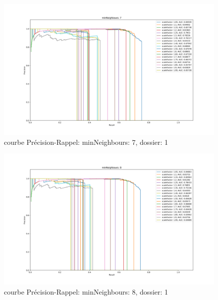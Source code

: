 \documentclass[a4paper,11pt]{article}
\begin{document}
	\begin{figure}[H]
	    \begin{center}
		\includegraphics[scale = 0.4]{images/courbes/folder_01_minN_7.png}
		\caption{courbe Précision-Rappel: minNeighbours: 7, dossier: 1}
		\label{fig:minN_2}
	    \end{center}
	\end{figure}

	\begin{figure}[H]
	    \begin{center}
		\includegraphics[scale = 0.4]{images/courbes/folder_01_minN_8.png}
		\caption{courbe Précision-Rappel: minNeighbours: 8, dossier: 1}
		\label{fig:minN_2}
	    \end{center}
	\end{figure}
\end{document}
